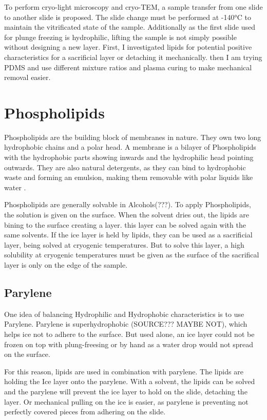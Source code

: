 To perform cryo-light microscopy and cryo-TEM, a sample transfer from one slide to another slide is proposed. The slide change must be performed at -140°C to maintain the vitrificated state of the sample. Additionally as the first slide used for plunge freezing is hydrophilic, lifting the sample is not simply possible without designing a new layer. First, I investigated lipids for potential positive characteristics for a sacrificial layer or detaching it mechanically. then I am trying PDMS and use different mixture ratios and plasma curing to make mechanical removal easier.

\section{Phospholipids}
\label{section:metodeLipide}

Phospholipids are the building block of membranes in nature. They own two long hydrophobic chains and a polar head. A membrane is a bilayer of Phospholipids with the hydrophobic parts showing inwards and the hydrophilic head pointing outwards. They are also natural detergents, as they can bind to hydrophobic waste and forming an emulsion, making them removable with polar liquids like water \cite{SriramaM.BhairiPh.D..}.

Phospholipids are generally solvable in Alcohols(???). To apply Phospholipids, the solution is given on the surface. When the solvent dries out, the lipids are bining to the surface creating a layer. this layer can be solved again with the same solvents. If the ice layer is held by lipids, they can be used as a sacrificial layer, being solved at cryogenic temperatures. But to solve this layer, a high solubility at cryogenic temperatures must be given as the surface of the sacrifical layer is only on the edge of the sample.

\subsection{Parylene}

One idea of balancing Hydrophilic and Hydrophobic characteristics is to use Parylene. Parylene is superhydrophobic (SOURCE??? MAYBE NOT), which helps ice not to adhere to the surface. But used alone, an ice layer could not be frozen on top with plung-freesing or by hand as a water drop would not spread on the surface. 

For this reason, lipids are used in combination with parylene. The lipids are holding the Ice layer onto the parylene. With a solvent, the lipids can be solved and the parylene will prevent the ice layer to hold on the slide, detaching the layer. Or mechanical pulling on the ice is easier, as parylene is preventing not perfectly covered pieces from adhering on the slide.

